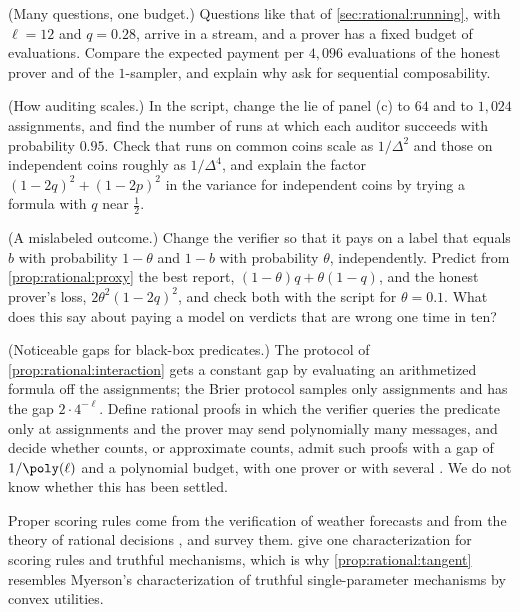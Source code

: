 \begin{refsection}
\begin{exercises}
\item \attack (Many questions, one budget.) Questions like that of \cref{sec:rational:running}, with $\ell=12$ and $q=0.28$, arrive in a stream, and a prover has a fixed budget of evaluations. Compare the expected payment per $4{,}096$ evaluations of the honest prover and of the $1$-sampler, and explain why \textcite{CampanelliGennaro2015} ask for sequential composability.\label{ex:rational:stream}

\item \simulation (How auditing scales.) In the script, change the lie of panel (c) to $64$ and to $1{,}024$ assignments, and find the number of runs at which each auditor succeeds with probability $0.95$. Check that runs on common coins scale as $1/\Delta^2$ and those on independent coins roughly as $1/\Delta^4$, and explain the factor $(1-2q)^2+(1-2p)^2$ in the variance for independent coins by trying a formula with $q$ near $\frac12$.\label{ex:rational:scaling}

\item \simulation (A mislabeled outcome.) Change the verifier so that it pays on a label that equals $b$ with probability $1-\theta$ and $1-b$ with probability $\theta$, independently. Predict from \cref{prop:rational:proxy} the best report, $(1-\theta)q+\theta(1-q)$, and the honest prover's loss, $2\theta^2(1-2q)^2$, and check both with the script for $\theta=0.1$. What does this say about paying a model on verdicts that are wrong one time in ten?\label{ex:rational:noisy}

\item \research (Noticeable gaps for black-box predicates.) The protocol of \cref{prop:rational:interaction} gets a constant gap by evaluating an arithmetized formula off the assignments; the Brier protocol samples only assignments and has the gap $2\cdot4^{-\ell}$. Define rational proofs in which the verifier queries the predicate only at assignments and the prover may send polynomially many messages, and decide whether counts, or approximate counts, admit such proofs with a gap of $1/\poly(\ell)$ and a polynomial budget, with one prover or with several \parencite{ChenMcCauleySingh2016}. We do not know whether this has been settled.\label{ex:rational:blackbox}
\end{exercises}

\notesandrefs
Proper scoring rules come from the verification of weather forecasts \parencite{Brier1950} and from the theory of rational decisions \parencite{Good1952}, and \textcite{GneitingRaftery2007} survey them. \Textcite{FrongilloKash2021} give one characterization for scoring rules and truthful mechanisms, which is why \cref{prop:rational:tangent} resembles Myerson's characterization of truthful single-parameter mechanisms by convex utilities.


\end{refsection}
